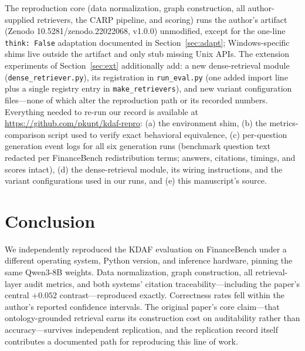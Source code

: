 \documentclass[11pt]{article}
\begin{document}
The reproduction core (data normalization, graph construction, all author-supplied retrievers, the CARP pipeline, and scoring) runs the author's artifact (Zenodo 10.5281/zenodo.22022068, v1.0.0) unmodified, except for the one-line \texttt{think: False} adaptation documented in Section~\ref{sec:adapt}; Windows-specific shims live outside the artifact and only stub missing Unix APIs. The extension experiments of Section~\ref{sec:ext} additionally add: a new dense-retrieval module (\texttt{dense\_retriever.py}), its registration in \texttt{run\_eval.py} (one added import line plus a single registry entry in \texttt{make\_retrievers}), and new variant configuration files---none of which alter the reproduction path or its recorded numbers. Everything needed to re-run our record is available at \url{https://github.com/pkupt/kdaf-repro}: (a) the environment shim, (b) the metrics-comparison script used to verify exact behavioral equivalence, (c) per-question generation event logs for all six generation runs (benchmark question text redacted per FinanceBench redistribution terms; answers, citations, timings, and scores intact), (d) the dense-retrieval module, its wiring instructions, and the variant configurations used in our runs, and (e) this manuscript's source.

\section{Conclusion}

We independently reproduced the KDAF evaluation on FinanceBench under a different operating system, Python version, and inference hardware, pinning the same Qwen3-8B weights. Data normalization, graph construction, all retrieval-layer audit metrics, and both systems' citation traceability---including the paper's central $+0.052$ contrast---reproduced exactly. Correctness rates fell within the author's reported confidence intervals. The original paper's core claim---that ontology-grounded retrieval earns its construction cost on auditability rather than accuracy---survives independent replication, and the replication record itself contributes a documented path for reproducing this line of work.
\end{document}
